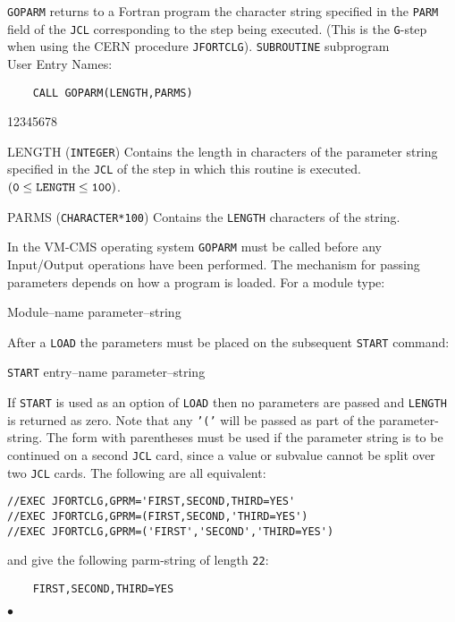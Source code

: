                              
                         
\Submitter{}                                
                         
{\tt GOPARM} returns to a Fortran program the character string
specified in the {\tt PARM} field of the {\tt JCL} corresponding to the
step being executed. (This is the {\tt G}-step when using the CERN
procedure {\tt JFORTCLG}).
\Structure
{\tt SUBROUTINE} subprogram \\
User Entry Names: 
\Usage
\begin{verbatim}
    CALL GOPARM(LENGTH,PARMS)
\end{verbatim}
\begin{DLtt}{12345678}
\item [LENGTH]  ({\tt INTEGER}) Contains the length in
characters of the parameter string specified in the {\tt JCL} of the
step in which this routine is executed. $({\tt 0 \leq LENGTH \leq 100})$.
\item [PARMS] ({\tt CHARACTER*100}) Contains the {\tt LENGTH} characters
of the string.
\end{DLtt}
\Restrict
In the VM-CMS operating system {\tt GOPARM} must be called before any
Input/Output operations have been performed. The mechanism for passing
parameters depends on how a program is loaded. For a module type:
\par
Module--name parameter--string
\par
After a {\tt LOAD} the parameters must be placed on the subsequent
{\tt START} command:
\par
{\tt START} entry--name parameter--string
\par
If {\tt START} is used as an option of {\tt LOAD} then no parameters are
passed and {\tt LENGTH} is returned as zero. Note that any {\tt '('}
will be passed as part of the parameter-string.
\Notes
The form with parentheses must be used if the parameter string is to be
continued on a second {\tt JCL} card, since a value or subvalue cannot
be split over two {\tt JCL} cards.
\Examples
The following are all equivalent:
\begin{verbatim}
//EXEC JFORTCLG,GPRM='FIRST,SECOND,THIRD=YES'
//EXEC JFORTCLG,GPRM=(FIRST,SECOND,'THIRD=YES')
//EXEC JFORTCLG,GPRM=('FIRST','SECOND','THIRD=YES')
\end{verbatim}
and give the following parm-string of length {\tt 22}:
\begin{verbatim}
    FIRST,SECOND,THIRD=YES
\end{verbatim}
$\bullet$
